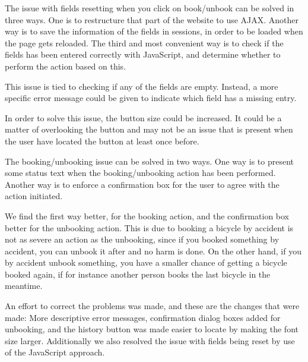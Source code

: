 \begin{description}[style=nextline]
	\item[{\#}1 Fields reset]
	The issue with fields resetting when you click on book/unbook can be solved in three ways.
	One is to restructure that part of the website to use AJAX.
	Another way is to save the information of the fields in sessions, in order to be loaded when the page gets reloaded. 
	The third and most convenient way is to check if the fields has been entered correctly with JavaScript, and determine whether to perform the action based on this.
	\item[{\#}2 Error message understandability]
	This issue is tied to checking if any of the fields are empty.
	Instead, a more specific error message could be given to indicate which field has a missing entry.
	\item[{\#}3 Difficulty finding history]
	In order to solve this issue, the button size could be increased.
	It could be a matter of overlooking the button and may not be an issue that is present when the user have located the button at least once before.
	\item[{\#}4 Booking/Unbooking confirmation]
	The booking/unbooking issue can be solved in two ways.
	One way is to present some status text when the booking/unbooking action has been performed.
	Another way is to enforce a confirmation box for the user to agree with the action initiated.
	
	We find the first way better, for the booking action, and the confirmation box better for the unbooking action.
	This is due to booking a bicycle by accident is not as severe an action as the unbooking, since if you booked something by accident, you can unbook it after and no harm is done.
	On the other hand, if you by accident unbook something, you have a smaller chance of getting a bicycle booked again, if for instance another person books the last bicycle in the meantime.
\end{description}

An effort to correct the problems was made, and these are the changes that were made: More descriptive error messages, confirmation dialog boxes added for unbooking, and the history button was made easier to locate by making the font size larger.
Additionally we also resolved the issue with fields being reset by use of the JavaScript approach.